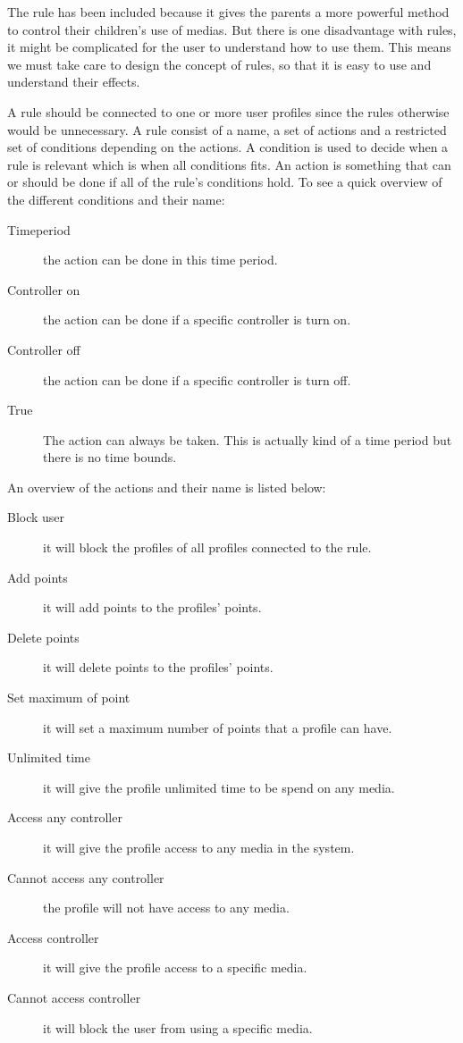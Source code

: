 The rule has been included because it gives the parents a more powerful method to control their children's use of medias. 
But there is one disadvantage with rules, it might be complicated for the user to understand how to use them. 
This means we must take care to design the concept of rules, so that it is easy to use and understand their effects.

A rule should be connected to one or more user profiles since the rules otherwise would be unnecessary. A rule consist of a name, a set of actions and  a restricted set of conditions depending on the actions. A condition is used to decide when a rule is relevant which is when all conditions fits. An action is something that can or should be done if all of the rule's conditions hold.
To see a quick overview of the different conditions and their name:

\begin{description}
	\item[Timeperiod] the action can be done in this time period.%
	\item[Controller on] the action can be done if a specific controller is turn on. 
	\item[Controller off] the action can be done if a specific controller is turn off. 
	\item[True] The action can always be taken. This is actually kind of a time period but there is no time bounds.
\end{description}

An overview of the actions and their name is listed below:

\begin{description}
	\item[Block user] it will block the profiles of all profiles connected to the rule. 
	\item[Add points] it will add points to the profiles' points.
	\item[Delete points]  it will delete points to the profiles' points.  
	\item[Set maximum of point] it will set a maximum number of points that a profile can have. 
	\item[Unlimited time] it will give the profile unlimited time to be spend on any media. 
	\item[Access any controller] it will give the profile access to any media in the system. 
	\item[Cannot access any controller] the profile will not have access to any media. 
	\item[Access controller] it will give the profile access to a specific media. 
	\item[Cannot access controller] it will block the user from using a specific media. 
\end{description}

